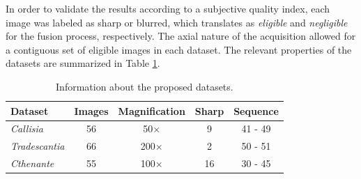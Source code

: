 In order to validate the results according to a subjective quality index, each image was labeled as sharp or blurred, which translates as \emph{eligible} and \emph{negligible} for the fusion process, respectively. The axial nature of the acquisition allowed for a contiguous set of eligible images in each dataset. The relevant properties of the datasets are summarized in Table \ref{tab:dataset_info}. 

\begin{table}[ht]
    \centering
    \caption{Information about the proposed datasets.}
    \label{tab:dataset_info}
    \begin{tabular}{lcccc}
        \toprule
        \textbf{Dataset} & \textbf{Images} & \textbf{Magnification} & \textbf{Sharp} & \textbf{Sequence}\\
        \midrule
        \textit{Callisia} & 56 & 50$\times$ & 9 & 41 - 49\\
        \textit{Tradescantia} & 66 & 200$\times$ & 2 & 50 - 51\\
        \textit{Cthenante} & 55 & 100$\times$ & 16 & 30 - 45\\
        \bottomrule
    \end{tabular}
    \centering
    \fautor
\end{table}